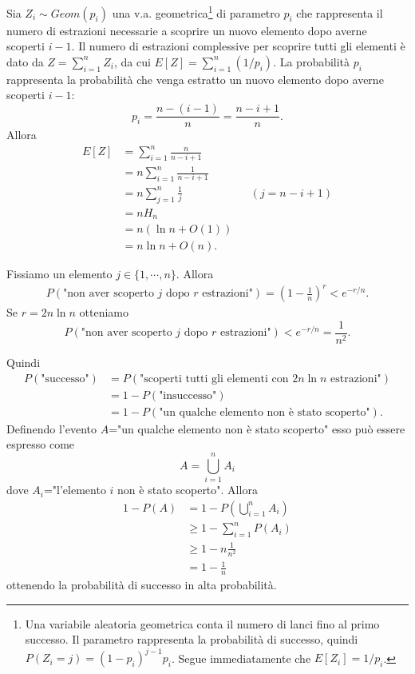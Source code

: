 Sia $Z_i\sim Geom(p_i)$ una v.a. geometrica\footnote{Una variabile aleatoria geometrica conta il numero di lanci fino al primo successo. Il parametro rappresenta la probabilità di successo, quindi $P(Z_i=j)=(1-p_i)^{j-1}p_i$. Segue immediatamente che $E[Z_i]=1/p_i$.} di parametro $p_i$ che rappresenta il numero di estrazioni necessarie a scoprire un nuovo elemento dopo averne scoperti $i-1$. Il numero di estrazioni complessive per scoprire tutti gli elementi è dato da $Z=\sum_{i=1}^nZ_i$, da cui $E[Z]=\sum_{i=1}^n(1/p_i)$. La probabilità $p_i$ rappresenta la probabilità che venga estratto un nuovo elemento dopo averne scoperti $i-1$:
\[
p_i=\frac{n-(i-1)}{n}=\frac{n-i+1}{n}.
\]
Allora
\begin{align*}
E[Z]&=\sum_{i=1}^n\frac{n}{n-i+1} \\
&=n\sum_{i=1}^n\frac{1}{n-i+1} \\
&=n\sum_{j=1}^n\frac{1}{j} && (j=n-i+1) \\
&=nH_n \\
&=n(\ln n+O(1)) \\
&=n\ln n+O(n).
\end{align*}

Fissiamo un elemento $j\in\{1,\cdots,n\}$. Allora
\begin{align*}
P(\text{"non aver scoperto }j\text{ dopo }r\text{ estrazioni"})=\left(1-\frac{1}{n}\right)^r<e^{-r/n}.
\end{align*}
Se $r=2n\ln n$ otteniamo
\[
P(\text{"non aver scoperto }j\text{ dopo }r\text{ estrazioni"})<e^{-r/n}=\frac{1}{n^2}.
\]

Quindi
\begin{align*}
P(\text{"successo"})&=P(\text{"scoperti tutti gli elementi con }2n\ln n\text{ estrazioni"}) \\
&=1-P(\text{"insuccesso"}) \\
&=1-P(\text{"un qualche elemento non è stato scoperto"}).
\end{align*}
Definendo l'evento $A$="un qualche elemento non è stato scoperto" esso può essere espresso come
\[
A=\bigcup_{i=1}^nA_i
\]
dove $A_i$="l'elemento $i$ non è stato scoperto".
Allora
\begin{align*}
1-P(A)&=1-P\left(\bigcup_{i=1}^nA_i\right) \\
&\geq 1-\sum_{i=1}^nP(A_i) \\
&\geq 1-n\frac{1}{n^2} \\
&=1-\frac{1}{n}
\end{align*}
ottenendo la probabilità di successo in alta probabilità.
